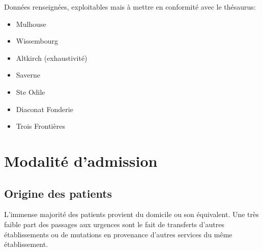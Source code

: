 \documentclass[12pt,english,french,twoside]{book}\usepackage[]{graphicx}\usepackage[]{color}
\begin{document}
Données renseignées, exploitables mais à mettre en conformité avec le thésaurus:
\begin{itemize}
  \item Mulhouse
  \item Wissembourg
  \item Altkirch (exhaustivité)
  \item Saverne
  \item Ste Odile
  \item Diaconat Fonderie
  \item Trois Frontières
\end{itemize}


\newpage
\chapter{Modalité d'admission}



\section*{Origine des patients}


L'immense majorité des patients provient du domicile ou son équivalent. Une très faible part des passages aux urgences sont le fait de transferts d'autres établissements ou de mutations en provenance d'autres services du même établissement.
\end{document}

